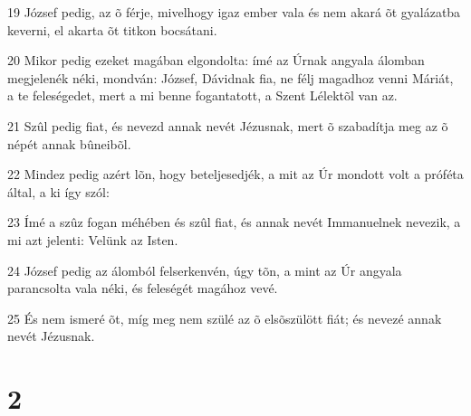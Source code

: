 \par 19 József pedig, az õ férje, mivelhogy igaz ember vala és nem akará õt gyalázatba keverni, el akarta õt titkon bocsátani.
\par 20 Mikor pedig ezeket magában elgondolta: ímé az Úrnak angyala álomban megjelenék néki, mondván: József, Dávidnak fia, ne félj magadhoz venni Máriát, a te feleségedet, mert a mi benne fogantatott, a Szent Lélektõl van az.
\par 21 Szûl pedig fiat, és nevezd annak nevét Jézusnak, mert õ szabadítja meg az õ népét  annak bûneibõl.
\par 22 Mindez pedig azért lõn, hogy beteljesedjék, a mit az Úr mondott volt a próféta által, a ki így szól:
\par 23 Ímé a szûz fogan méhében és szûl fiat, és annak nevét Immanuelnek nevezik, a mi azt jelenti: Velünk az Isten.
\par 24 József pedig az álomból felserkenvén, úgy tõn, a mint az Úr angyala parancsolta vala néki, és feleségét magához vevé.
\par 25 És nem ismeré õt, míg meg nem szülé az õ elsõszülött fiát; és nevezé annak nevét Jézusnak.

\chapter{2}

